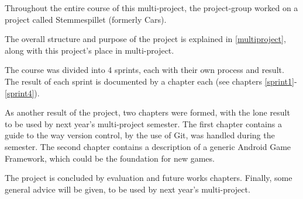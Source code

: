 Throughout the entire course of this multi-project, the project-group worked on a project called Stemmespillet (formerly Cars).

The overall structure and purpose of the project is explained in \cref{multiproject}, along with this project's place in multi-project.

The course was divided into 4 sprints, each with their own process and result.
The result of each sprint is documented by a chapter each (see chapters \ref{sprint1}-\ref{sprint4}).

As another result of the project, two chapters were formed, with the lone result to be used by next year's multi-project semester.
The first chapter contains a guide to the way version control, by the use of Git, was handled during the semester.
The second chapter contains a description of a generic Android Game Framework, which could be the foundation for new games.

The project is concluded by evaluation and future works chapters.
Finally, some general advice will be given, to be used by next year's multi-project.